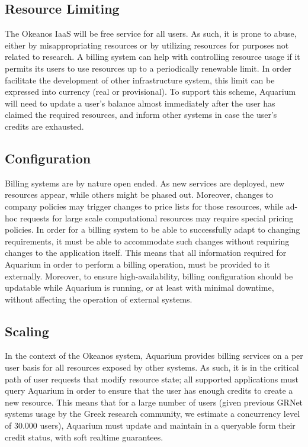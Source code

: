 \documentclass[preprint,10pt]{sigplanconf}
\begin{document}
\subsection{Resource Limiting}

The Okeanos IaaS will be free service for all users. As such, it is prone to
abuse, either by misappropriating resources or by utilizing resources for
purposes not related to research. A billing system can help with controlling
resource usage if it permits its users to use resources up to a periodically
renewable limit. In order facilitate the development of other infrastructure
system, this limit can be expressed into currency (real or provisional). To
support this scheme, Aquarium will need to update a user's balance almost
immediately after the user has claimed the required resources, and inform other
systems in case the user's credits are exhausted. 

\subsection{Configuration}

Billing systems are by nature open ended. As new services are deployed, new
resources appear, while others might be phased out.  Moreover, changes to
company policies may trigger changes to price lists for those resources, while
ad-hoc requests for large scale computational resources may require special
pricing policies. In order for a billing system to be able to successfully
adapt to changing requirements, it must be able to accommodate such changes
without requiring changes to the application itself. This means that all
information required for Aquarium in order to perform a billing operation,
must be provided to it externally. Moreover, to ensure high-availability,
billing configuration should be updatable while Aquarium is running, or at
least with minimal downtime, without affecting the operation of external
systems.


\subsection{Scaling}

In the context of the Okeanos system, Aquarium provides billing services on a
per user basis for all resources exposed by other systems. As such, it is in
the critical path of user requests that modify resource state; all supported
applications must query Aquarium in order to ensure that the user has enough
credits to create a new resource. This means that for a large number of users
(given previous GRNet systems usage by the Greek research community, we
estimate a concurrency level of 30.000 users), Aquarium must update and
maintain in a queryable form their credit status, 
with soft realtime guarantees. 
\end{document}
